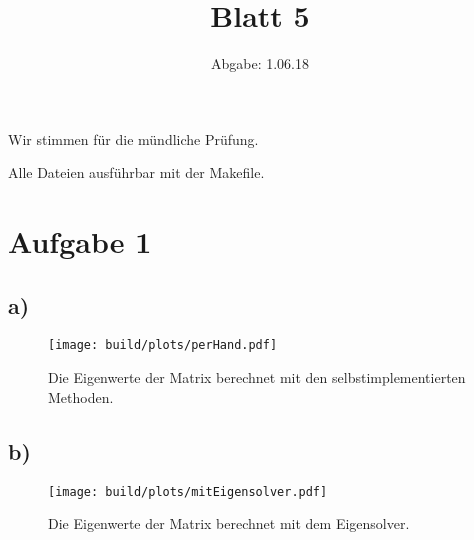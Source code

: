 

\usepackage{listings}
\usepackage[dvipsnames]{xcolor}

\title{Blatt 5}
\date{
  Abgabe: 1.06.18
}


\maketitle
Wir stimmen für die mündliche Prüfung.

Alle Dateien ausführbar mit der Makefile. %
\section*{Aufgabe 1}
\subsection*{a)}
\begin{figure}
  \centering
  \texttt{[image: build/plots/perHand.pdf]}
  \caption{Die Eigenwerte der Matrix berechnet mit den selbstimplementierten Methoden.}
\end{figure}


\subsection*{b)}
\begin{figure}
  \centering
  \texttt{[image: build/plots/mitEigensolver.pdf]}
  \caption{Die Eigenwerte der Matrix berechnet mit dem Eigensolver.}
\end{figure}








